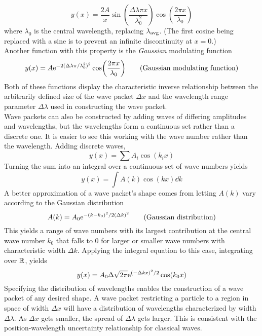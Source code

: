 \documentclass{subfiles}
\begin{document}
			\[y(x) = \frac{2A}{x}\sin(\frac{\Delta\lambda\pi x}{\lambda_0^2})\cos(\frac{2\pi x}{\lambda_0})\]
			where \(\lambda_0\) is the central wavelength, replacing \(\lambda_{\text{avg}}\). (The first cosine being replaced with a sine is to prevent an infinite discontinuity at \(x = 0\).) \\
			Another function with this property is the \textit{Gaussian} modulating function
			\[y(x) = A\text{e}^{-2(\Delta\lambda\pi/\lambda_0^2)^2}\cos(\frac{2\pi x}{\lambda_0}) \tag{Gaussian modulating function}\]
			Both of these functions display the characteristic inverse relationship between the arbitrarily defined size of the wave packet \(\Delta x\) and the wavelength range parameter \(\Delta\lambda\) used in constructing the wave packet. \\
			Wave packets can also be constructed by adding waves of differing amplitudes and wavelengths, but the wavelengths form a continuous set rather than a discrete one. It is easier to see this working with the wave number rather than the wavelength. Adding discrete waves,
			\[y(x) = \sum A_i\cos(k_ix) \tag{discrete wave packet}\]
			Turning the sum into an integral over a continuous set of wave numbers yields
			\[y(x) = \int A(k)\cos(kx) \dd{k} \tag{continuous wave packet}\]
			A better approximation of a wave packet's shape comes from letting \(A(k)\) vary according to the Gaussian distribution
			\[A(k) = A_0\text{e}^{-(k - k_0)^2/2(\Delta k)^2} \tag{Gaussian distribution}\]
			This yields a range of wave numbers with its largest contribution at the central wave number \(k_0\) that falls to 0 for larger or smaller wave numbers with characteristic width \(\Delta k\). Applying the integral equation to this case, integrating over \(\mathbb{R}\), yields
			\[y(x) = A_0\Delta\sqrt{2\pi}\text{e}^{(-\Delta kx)^2/2}\cos(k_0x)\]
			Specifying the distribution of wavelengths enables the construction of a wave packet of any desired shape. A wave packet restricting a particle to a region in space of width \(\Delta x\) will have a distribution of wavelengths characterized by width \(\Delta\lambda\). As \(\Delta x\) gets smaller, the spread of \(\Delta\lambda\) gets larger. This is consistent with the position-wavelength uncertainty relationship for classical waves.
\end{document}
